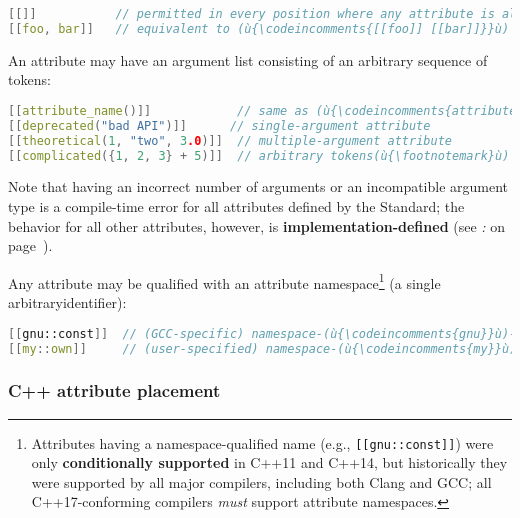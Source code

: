 \begin{lstlisting}[language=C++]
[[]]           // permitted in every position where any attribute is allowed
[[foo, bar]]   // equivalent to (ù{\codeincomments{[[foo]] [[bar]]}}ù)
\end{lstlisting}

\noindent An attribute may have an argument list consisting of an
arbitrary sequence of tokens:

\begin{lstlisting}[language=C++]
[[attribute_name()]]            // same as (ù{\codeincomments{attribute\_name}}ù)
[[deprecated("bad API")]]      // single-argument attribute
[[theoretical(1, "two", 3.0)]]  // multiple-argument attribute
[[complicated({1, 2, 3} + 5)]]  // arbitrary tokens(ù{\footnotemark}ù)
\end{lstlisting}

\noindent Note that having an incorrect number of arguments or an incompatible
argument type is a compile-time error for all  attributes defined by the Standard; %
the behavior for all other attributes,
 however, is
\textbf{implementation-defined} (see {\it{}:} {\it{}} on page~\pageref{unrecognized-attributes-have-implementation-defined-behavior}).

Any attribute may be qualified with an attribute namespace{\cprotect\footnote{Attributes
having a namespace-qualified name (e.g., \texttt{[[gnu::const]]}) were
only \textbf{conditionally supported} in C++11 and C++14, but
historically they were supported by all major compilers, including both
Clang and GCC; all C++17-conforming compilers \textit{must} support attribute namespaces.}} (a single arbitrary\linebreak[4] \mbox{identifier}):

\begin{lstlisting}[language=C++]
[[gnu::const]]  // (GCC-specific) namespace-(ù{\codeincomments{gnu}}ù)-qualified (ù{\codeincomments{const}}ù) attribute
[[my::own]]     // (user-specified) namespace-(ù{\codeincomments{my}}ù)-qualified (ù{\codeincomments{own}}ù) attribute
\end{lstlisting}


\subsubsection[C++ attribute placement]{C++ attribute placement}\label{c++-attribute-placement}

